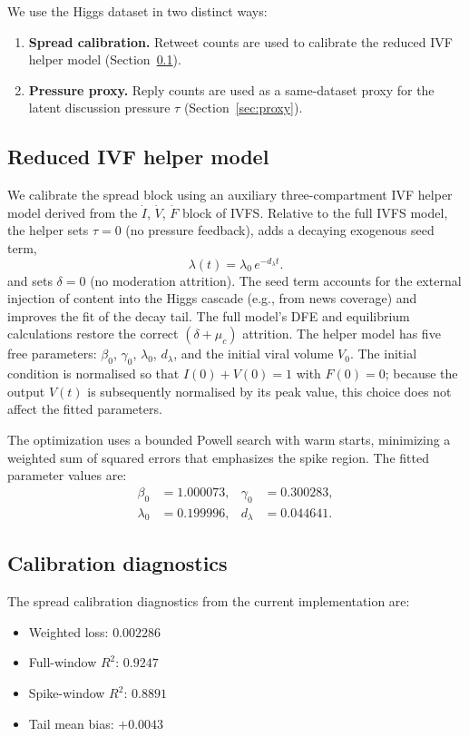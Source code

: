 \documentclass[11pt]{article}
\begin{document}
We use the Higgs dataset in two distinct ways:
\begin{enumerate}[leftmargin=1.5em]
    \item \textbf{Spread calibration.} Retweet counts are used to calibrate the reduced IVF helper model (Section~\ref{sec:helper}).
    \item \textbf{Pressure proxy.} Reply counts are used as a same-dataset proxy for the latent discussion pressure $\tau$ (Section~\ref{sec:proxy}).
\end{enumerate}

\subsection{Reduced IVF helper model}
\label{sec:helper}

We calibrate the spread block using an auxiliary three-compartment IVF helper model derived from the $\dot{I}$, $\dot{V}$, $\dot{F}$ block of IVFS. Relative to the full IVFS model, the helper sets $\tau = 0$ (no pressure feedback), adds a decaying exogenous seed term,
\[
\lambda(t) = \lambda_0\, e^{-d_\lambda t}.
\]
and sets $\delta = 0$ (no moderation attrition). The seed term accounts for the external injection of content into the Higgs cascade (e.g., from news coverage) and improves the fit of the decay tail. The full model's DFE and equilibrium calculations restore the correct $(\delta + \mu_c)$ attrition. The helper model has five free parameters: $\beta_0$, $\gamma_0$, $\lambda_0$, $d_\lambda$, and the initial viral volume $V_0$. The initial condition is normalised so that $I(0) + V(0) = 1$ with $F(0) = 0$; because the output $V(t)$ is subsequently normalised by its peak value, this choice does not affect the fitted parameters.

The optimization uses a bounded Powell search with warm starts, minimizing a weighted sum of squared errors that emphasizes the spike region. The fitted parameter values are:
\begin{align*}
\beta_0 &= 1.000073, & \gamma_0 &= 0.300283, \\
\lambda_0 &= 0.199996, & d_\lambda &= 0.044641.
\end{align*}

\subsection{Calibration diagnostics}

The spread calibration diagnostics from the current implementation are:
\begin{itemize}[leftmargin=1.5em]
    \item Weighted loss: $0.002286$
    \item Full-window $R^2$: $0.9247$
    \item Spike-window $R^2$: $0.8891$
    \item Tail mean bias: $+0.0043$
\end{itemize}
\end{document}
